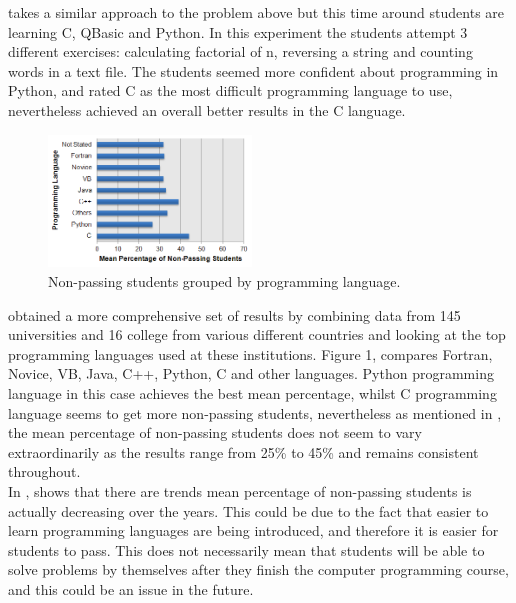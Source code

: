 \documentclass[a4paper]{article}
\begin{document}
\begin{appendices}
	\textcite{KrpanBilobrk2011} takes a similar approach to the problem above but this time around students are learning C, QBasic and Python. In this experiment the students attempt 3 different exercises: calculating factorial of n, reversing a string and counting words in a text file. The students seemed more confident about programming in Python, and rated C as the most difficult programming language to use, nevertheless achieved an overall better results in the C language.\\
	
	\begin{figure}
		\vspace{-20pt}
		\begin{center}
			\includegraphics[width=0.48\textwidth]{NonPassingStudents}
		\end{center}
		\caption[Non-passing students grouped by programming language]{Non-passing students grouped by programming language. \parencite{WatsonLi2014}}
		\vspace{-10pt}
	\end{figure}
	
	\textcite{WatsonLi2014} obtained a more comprehensive set of results by combining data from 145 universities and 16 college from various different countries and looking at the top programming languages used at these institutions. Figure 1, compares Fortran, Novice, VB, Java, C++, Python, C and other languages. Python programming language in this case achieves the best mean percentage, whilst C programming language seems to get more non-passing students, nevertheless as mentioned in \textcite{WatsonLi2014}, the mean percentage of non-passing students does not seem to vary extraordinarily as the results range from 25\% to 45\% and remains consistent throughout.\\
	
	In \textcite{WatsonLi2014}, shows that there are trends mean percentage of non-passing students is actually decreasing over the years. This could be due to the fact that easier to learn programming languages are being introduced, and therefore it is easier for students to pass. This does not necessarily mean that students will be able to solve problems by themselves after they finish the computer programming course, and this could be an issue in the future.\\
	

\end{appendices}
\end{document}

